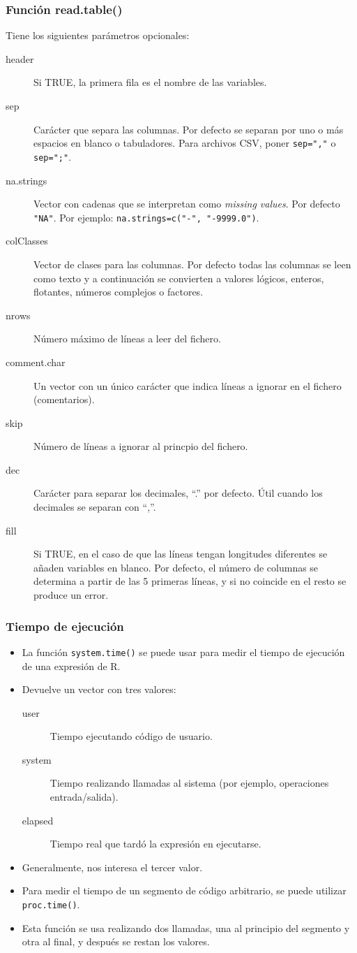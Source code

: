 \documentclass{beamer}
\begin{document}
\begin{frame}[allowframebreaks]
\frametitle{Función read.table()}

Tiene los siguientes parámetros opcionales:
\begin{description}
\item[header] Si TRUE, la primera fila es el nombre de las variables.
\item[sep] Carácter que separa las columnas. Por defecto se separan por uno o más espacios en blanco o tabuladores. Para archivos CSV, poner \texttt{sep=","} o \texttt{sep=";"}.
\item[na.strings] Vector con cadenas que se interpretan como \textit{missing values}. Por defecto \texttt{"NA"}. Por ejemplo: \texttt{na.strings=c("-", "-9999.0")}.
\item[colClasses] Vector de clases para las columnas. Por defecto todas las columnas se leen como texto y a continuación se convierten a valores lógicos, enteros, flotantes, números complejos o factores.
\framebreak
\item[nrows] Número máximo de líneas a leer del fichero.
\item[comment.char] Un vector con un único carácter que indica líneas a ignorar en el fichero (comentarios).
\item[skip] Número de líneas a ignorar al princpio del fichero.
\item[dec] Carácter para separar los decimales, ``.'' por defecto. Útil cuando los decimales se separan con ``,''.
\item[fill] Si TRUE, en el caso de que las líneas tengan longitudes diferentes se añaden variables en blanco. Por defecto, el número de columnas se determina a partir de las 5 primeras líneas, y si no coincide en el resto se produce un error.
\end{description}
\end{frame}

\begin{frame}
\frametitle{Tiempo de ejecución}
\begin{itemize}
\item La función \texttt{system.time()} se puede usar para medir el tiempo de ejecución de una expresión de R.
\item Devuelve un vector con tres valores:
\begin{description}
\item[user] Tiempo ejecutando código de usuario.
\item[system] Tiempo realizando llamadas al sistema (por ejemplo, operaciones entrada/salida).
\item[elapsed] Tiempo real que tardó la expresión en ejecutarse.
\end{description}
\item Generalmente, nos interesa el tercer valor.
\item Para medir el tiempo de un segmento de código arbitrario, se puede utilizar \texttt{proc.time()}.
\item Esta función se usa realizando dos llamadas, una al principio del segmento y otra al final, y después se restan los valores.
\end{itemize}
\end{frame}
\end{document}
